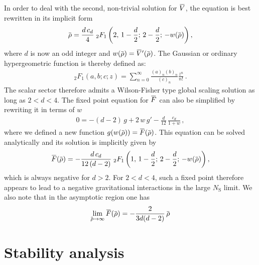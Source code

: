 \documentclass[11pt]{book} %
\newcommand{\overbar}[1]{\mkern 1.5mu\overline{\mkern-1.5mu#1\mkern-1.5mu}\mkern 1.5mu}
\newcommand\NS{ N_{\scriptscriptstyle{\mathrm{S}}} }
\newcommand{\bV}{\overbar V}
\newcommand{\bF}{\overbar F}
\newcommand{\brho}{\overbar \rho}
\numberwithin{equation}{chapter}
\begin{document}
In order to deal with the second, non-trivial solution for $\bV$,
the equation is best rewritten in its implicit form
\begin{align}
  \brho = \frac{d \, c_d}{4} \;
  _2F_1 \left( 2,\, 1 - \frac{d}{2};\, 2 - \frac{d}{2};\, -w(\brho) \right) ,
\end{align}
where $d$ is now an odd integer and $w(\brho)=\bV'(\brho)$.
The Gaussian or ordinary hypergeometric function is thereby defined as:
\begin{align}
  {}_2F_1(a,b;c;z) = \sum_{n=0}^\infty \frac{(a)_n (b)_n}{(c)_n} \frac{z^n}{n!} \,.
\end{align}
The scalar sector therefore admits a Wilson-Fisher type global scaling solution as long as $2<d<4$.
The fixed point equation for $\bF$ can also be simplified by rewriting it in terms of $w$
\begin{align}
  0 = -(d-2) \, g + 2 \, w \, g' - \frac{d}{12} \, \frac{c_d}{1+w} \,,
\end{align}
where we defined a new function $g(w(\brho)) = \bF (\brho)$.
This equation can be solved analytically and its solution is implicitly given by
\begin{align}
  \bF(\brho) = - \frac{d \, c_d}{12 \, (d-2)} \;
  _2F_1\left( 1,\, 1 - \frac{d}{2};\, 2 - \frac{d}{2};\, -w(\brho) \right) ,
\end{align}
which is always negative for $d>2$. For $2<d<4$, such a fixed point therefore appears
to lead to a negative gravitational interactions in the large $\NS$ limit.
We also note that in the asymptotic region one has
\begin{align}
  \lim_{\brho \to \infty} \bF(\brho)= -\frac{ 2 }{ 3 d (d-2) } \, \brho
\end{align}


\section{Stability analysis}
\end{document}
